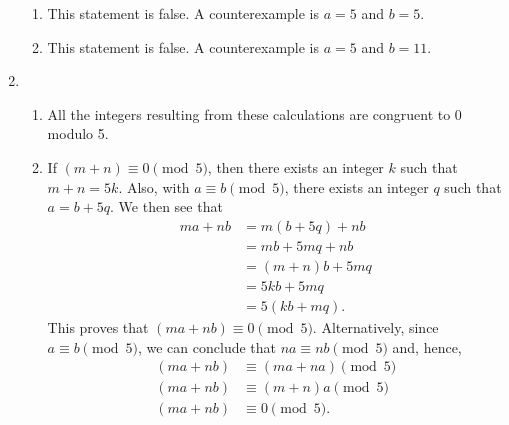 \begin{enumerate}
\begin{enumerate}
\item This statement is false.  A counterexample is $a = 5$ and $b = 5$.

\item This statement is false.  A counterexample is $a = 5$ and $b = 11$.
\end{enumerate}




\item \begin{enumerate}
\item All the integers resulting from these calculations are congruent to 0 modulo 5.

\item If $(m + n) \equiv 0 \pmod 5$, then there exists an integer $k$ such that $m + n = 5k$.  Also, with $a \equiv b \pmod 5$, there exists an integer $q$ such that $a = b + 5q$.  We then see that
\begin{align*}
ma + nb &= m(b + 5q) + nb \\
        &= mb + 5mq + nb \\
        &= (m + n)b + 5mq \\
        &= 5kb + 5mq \\
        &= 5(kb + mq).
\end{align*}
This proves that $(ma + nb) \equiv 0 \pmod 5$.  Alternatively, since $a \equiv b \pmod 5$, we can conclude that $na \equiv nb \pmod 5$ and, hence, 
\begin{align*}
(ma + nb) &\equiv (ma + na) \pmod 5 \\
(ma + nb) &\equiv (m + n)a \pmod 5 \\
(ma + nb) &\equiv 0 \pmod 5.
\end{align*}
\end{enumerate}
\end{enumerate}


